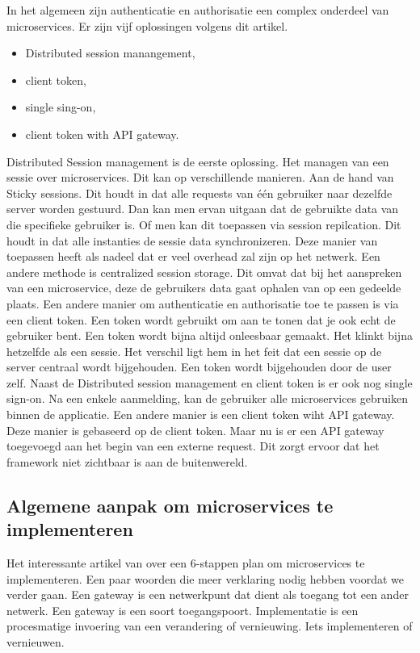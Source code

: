 In het algemeen zijn authenticatie en authorisatie een complex onderdeel van microservices.
Er zijn vijf oplossingen volgens dit artikel.
\begin{itemize}
	\item Distributed session manangement,
	\item client token,
	\item single sing-on, 
	\item client token with API gateway.
\end{itemize}
Distributed Session management is de eerste oplossing. Het managen van een sessie over microservices. Dit kan op verschillende manieren. Aan de hand van Sticky sessions. Dit houdt in dat alle requests van één gebruiker naar dezelfde server worden gestuurd. Dan kan men ervan uitgaan dat de gebruikte data van die specifieke gebruiker is. Of men kan dit toepassen via session repilcation. Dit houdt in dat alle instanties de sessie data synchronizeren. Deze manier van toepassen heeft als nadeel dat er veel overhead zal zijn op het netwerk. Een andere methode is centralized session storage. Dit omvat dat bij het aanspreken van een microservice, deze de gebruikers data gaat ophalen van op een gedeelde plaats. 
Een andere manier om authenticatie en authorisatie toe te passen is via een client token. Een token wordt gebruikt om aan te tonen dat je ook echt de gebruiker bent. Een token wordt bijna altijd onleesbaar gemaakt. Het klinkt bijna hetzelfde als een sessie. Het verschil ligt hem in het feit dat een sessie op de server centraal wordt bijgehouden. Een token wordt bijgehouden door de user zelf.
Naast de Distributed session management en client token is er ook nog single sign-on. Na een enkele aanmelding, kan de gebruiker alle microservices gebruiken binnen de applicatie. 
Een andere manier is een client token wiht API gateway. Deze manier is gebaseerd op de client token. Maar nu is er een API gateway toegevoegd aan het begin van een externe request. Dit zorgt ervoor dat het framework niet zichtbaar is aan de buitenwereld. 
\subsection{Algemene aanpak om microservices te implementeren}
Het interessante artikel van \textcite{Benetis2016} over een 6-stappen plan om microservices te implementeren. Een paar woorden die meer verklaring nodig hebben voordat we verder gaan. Een gateway is een netwerkpunt dat dient als toegang tot een ander netwerk. Een gateway is een soort toegangspoort. Implementatie is een procesmatige invoering van een verandering of vernieuwing. Iets implementeren of vernieuwen. 

